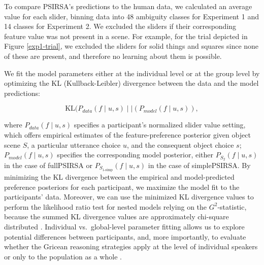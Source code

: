 \documentclass[10pt,a4paper]{article}
\newcommand{\gcs}[1]{\textcolor{blue}{[gcs: #1]}}
\begin{document}

To compare PSIRSA's predictions to the human data, we calculated an average value for each slider, binning data into 48 ambiguity classes for Experiment 1 and 14 classes for Experiment 2. We excluded the sliders if their corresponding feature value was not present in a scene. For example, for the trial depicted in Figure \ref{exp1-trial}, we excluded the sliders for solid things and squares since none of these are present, and therefore no learning about them is possible.

We fit the model parameters either at the individual level or at the group level by optimizing the KL (Kullback-Leibler) divergence between the data and the model predictions:

$$\textrm{KL}(P_{data}(f \mid u,s)\mid\mid (P_{model}(f\mid u,s)),$$

\noindent where $P_{data}(f\mid u,s)$ specifies a participant's normalized slider value setting, which offers empirical estimates of the feature-preference posterior given object scene $S$, a particular utterance choice $u$, and the consequent object choice $s$;
$P_{model}(f\mid u,s)$ specifies the corresponding model posterior, either $P_{S_{2}}(f\mid u,s)$ in the case of fullPSIRSA or $P_{S_{1\textrm{-simp}}}(f\mid u,s)$ in the case of simplePSIRSA. 
By minimizing the KL divergence between the empirical and model-predicted preference posteriors for each participant, we maximize the model fit to the participants' data. 
Moreover, we can use the minimized KL divergence values to perform the likelihood ratio test for nested models relying on the $G^2$-statistic, because the summed KL divergence values are approximately chi-square distributed \cite{Lewandowsky:2011}. 
Individual vs.~global-level parameter fitting allows us to explore potential differences between participants, and, more importantly, to evaluate whether the Gricean reasoning strategies apply at the level of individual speakers or only to the population as a whole \cite{franke2016reasoning}. 
\end{document}
